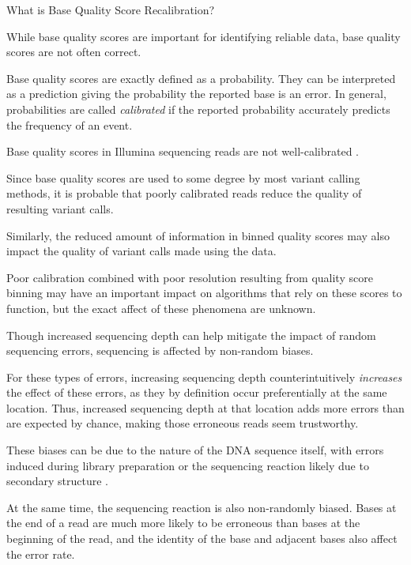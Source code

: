 \documentclass{article}
\begin{document}
\begin{outline}
	\item What is Base Quality Score Recalibration?
	\begin{outline}
		\item While base quality scores are important for identifying reliable data, base quality scores are not often correct.
		\item Base quality scores are exactly defined as a probability. They can be interpreted as a prediction giving the probability the reported base is an error. In general, probabilities are called \textit{calibrated} if the reported probability accurately predicts the frequency of an event.
		\item Base quality scores in Illumina sequencing reads are not well-calibrated \parencite{callahan_dada2:_2016}. %
		\item Since base quality scores are used to some degree by most variant calling methods, it is probable that poorly calibrated reads reduce the quality of resulting variant calls.
		\item Similarly, the reduced amount of information in binned quality scores may also impact the quality of variant calls made using the data.
		\item Poor calibration combined with poor resolution resulting from quality score binning may have an important impact on algorithms that rely on these scores to function, but the exact affect of these phenomena are unknown.
		\item Though increased sequencing depth can help mitigate the impact of random sequencing errors, sequencing is affected by non-random biases. %
		\item For these types of errors, increasing sequencing depth counterintuitively \textit{increases} the effect of these errors, as they by definition occur preferentially at the same location. Thus, increased sequencing depth at that location adds more errors than are expected by chance, making those erroneous reads seem trustworthy. 
		\item These biases can be due to the nature of the DNA sequence itself, with errors induced during library preparation or the sequencing reaction likely due to secondary structure \parencite{meacham_identification_2011, nakamura_sequence-specific_2011}.
		\item At the same time, the sequencing reaction is also non-randomly biased. Bases at the end of a read are much more likely to be erroneous than bases at the beginning of the read, and the identity of the base and adjacent bases also affect the error rate. %

\end{outline}
\end{outline}
\end{document}
